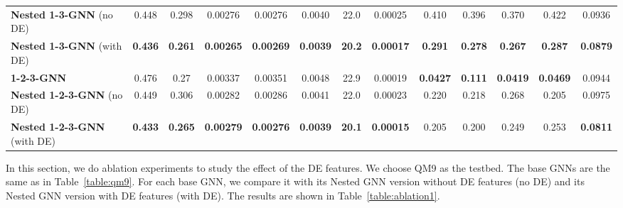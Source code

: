 \documentclass{article}
\begin{document}
\begin{table*}[h!]
\begin{center}
{\begin{tabular}{lcccccccccccc}
    \textbf{Nested 1-3-GNN} (no DE) & \cellcolor[HTML]{E7FFE2}0.448 &  \cellcolor[HTML]{E7FFE2}0.298 & \cellcolor[HTML]{E7FFE2}0.00276 & \cellcolor[HTML]{E7FFE2}0.00276 & \cellcolor[HTML]{E7FFE2}0.0040 & \cellcolor[HTML]{E7FFE2}22.0 & \cellcolor[HTML]{E7FFE2}0.00025 & \cellcolor[HTML]{E7FFE2}0.410 & \cellcolor[HTML]{E7FFE2}0.396 & \cellcolor[HTML]{E7FFE2}0.370 &\cellcolor[HTML]{E7FFE2} 0.422 & \cellcolor[HTML]{E7FFE2}0.0936\\
    \textbf{Nested 1-3-GNN} (with DE) & \cellcolor[HTML]{C3FFB5}\textbf{0.436} &  \cellcolor[HTML]{C3FFB5}\textbf{0.261} & \cellcolor[HTML]{C3FFB5}\textbf{0.00265} & \cellcolor[HTML]{C3FFB5}\textbf{0.00269} & \cellcolor[HTML]{C3FFB5}\textbf{0.0039} & \cellcolor[HTML]{C3FFB5}\textbf{20.2} & \cellcolor[HTML]{C3FFB5}\textbf{0.00017} & \cellcolor[HTML]{C3FFB5}\textbf{0.291} & \cellcolor[HTML]{C3FFB5}\textbf{0.278} & \cellcolor[HTML]{C3FFB5} \textbf{0.267} & \cellcolor[HTML]{C3FFB5}\textbf{0.287} & \cellcolor[HTML]{C3FFB5}\textbf{0.0879}\\
    \midrule
    \textbf{1-2-3-GNN} & 0.476 &  0.27 & 0.00337 & 0.00351 & 0.0048 & 22.9 & 0.00019 & \textbf{0.0427} & \textbf{0.111} & \textbf{0.0419} & \textbf{0.0469} & 0.0944\\
    \textbf{Nested 1-2-3-GNN} (no DE) & \cellcolor[HTML]{E7FFE2}0.449 &  0.306 & \cellcolor[HTML]{E7FFE2}0.00282 & \cellcolor[HTML]{E7FFE2}0.00286 & \cellcolor[HTML]{E7FFE2}0.0041 & \cellcolor[HTML]{E7FFE2}22.0 & 0.00023 & 0.220 & 0.218 & 0.268 & 0.205 & 0.0975\\
    \textbf{Nested 1-2-3-GNN} (with DE) & \cellcolor[HTML]{C3FFB5}\textbf{0.433} &  \textbf{0.265} & \cellcolor[HTML]{C3FFB5}\textbf{0.00279} & \cellcolor[HTML]{C3FFB5}\textbf{0.00276} & \cellcolor[HTML]{C3FFB5}\textbf{0.0039} & \cellcolor[HTML]{C3FFB5}\textbf{20.1} & \textbf{0.00015} & 0.205 & 0.200 & 0.249 & 0.253 & \textbf{0.0811}\\
  \bottomrule
\end{tabular}
}
\end{center}
\vspace{-5pt}
\end{table*}

In this section, we do ablation experiments to study the effect of the DE features. We choose QM9 as the testbed. The base GNNs are the same as in Table~\ref{table:qm9}. For each base GNN, we compare it with its Nested GNN version without DE features (no DE) and its Nested GNN version with DE features (with DE). The results are shown in Table~\ref{table:ablation1}.
\end{document}
